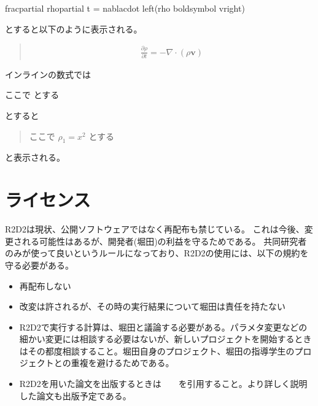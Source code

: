 \documentclass[letterpaper,10pt,dvipdfmx,report]{sphinxmanual}
\begin{document}
\begin{sphinxVerbatim}[commandchars=\\\{\}]
  

    \PYGZbs{}frac\PYGZob{}\PYGZbs{}partial \PYGZbs{}rho\PYGZcb{}\PYGZob{}\PYGZbs{}partial t\PYGZcb{} = \PYGZhy{}\PYGZbs{}nabla\PYGZbs{}cdot \PYGZbs{}left(\PYGZbs{}rho \PYGZob{}\PYGZbs{}boldsymbol v\PYGZcb{}\PYGZbs{}right)
\end{sphinxVerbatim}

とすると以下のように表示される。
\begin{quote}
\begin{equation*}
\begin{split}\frac{\partial \rho}{\partial t} = -\nabla\cdot \left(\rho {\boldsymbol v}\right)\end{split}
\end{equation*}\end{quote}

インラインの数式では

\begin{sphinxVerbatim}[commandchars=\\\{\}]
ここで  とする
\end{sphinxVerbatim}

とすると
\begin{quote}

ここで \(\rho_1=x^2\) とする
\end{quote}

と表示される。


\chapter{ライセンス}
\label{\detokenize{index:id1}}
R2D2は現状、公開ソフトウェアではなく再配布も禁じている。
これは今後、変更される可能性はあるが、開発者(堀田)の利益を守るためである。
共同研究者のみが使って良いというルールになっており、R2D2の使用には、以下の規約を守る必要がある。
\begin{itemize}
\item {} 
再配布しない

\item {} 
改変は許されるが、その時の実行結果について堀田は責任を持たない

\item {} 
R2D2で実行する計算は、堀田と議論する必要がある。パラメタ変更などの細かい変更には相談する必要はないが、新しいプロジェクトを開始するときはその都度相談すること。堀田自身のプロジェクト、堀田の指導学生のプロジェクトとの重複を避けるためである。

\item {} 
R2D2を用いた論文を出版するときは　　を引用すること。より詳しく説明した論文も出版予定である。

\end{itemize}
\end{document}
